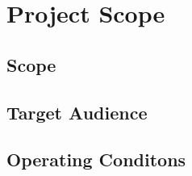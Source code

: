 \chapter{Project Scope}
\label{ch:scope}

\section{Scope}
\section{Target Audience}
\section{Operating Conditons}